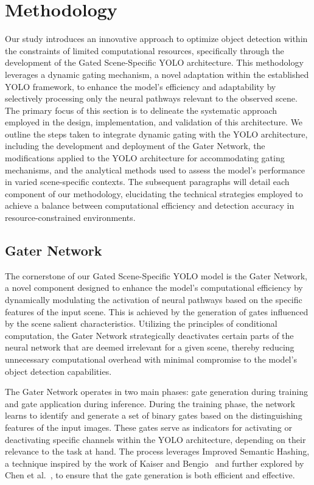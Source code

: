 \section{Methodology} 

Our study introduces an innovative approach to optimize object detection within the constraints of limited computational resources, specifically through the development of the Gated Scene-Specific YOLO architecture. This methodology leverages a dynamic gating mechanism, a novel adaptation within the established YOLO framework, to enhance the model's efficiency and adaptability by selectively processing only the neural pathways relevant to the observed scene. The primary focus of this section is to delineate the systematic approach employed in the design, implementation, and validation of this architecture. We outline the steps taken to integrate dynamic gating with the YOLO architecture, including the development and deployment of the Gater Network, the modifications applied to the YOLO architecture for accommodating gating mechanisms, and the analytical methods used to assess the model's performance in varied scene-specific contexts. The subsequent paragraphs will detail each component of our methodology, elucidating the technical strategies employed to achieve a balance between computational efficiency and detection accuracy in resource-constrained environments.

\subsection{Gater Network}
The cornerstone of our Gated Scene-Specific YOLO model is the Gater Network, a novel component designed to enhance the model's computational efficiency by dynamically modulating the activation of neural pathways based on the specific features of the input scene. This is achieved by the generation of gates influenced by the scene salient characteristics. Utilizing the principles of conditional computation, the Gater Network strategically deactivates certain parts of the neural network that are deemed irrelevant for a given scene, thereby reducing unnecessary computational overhead with minimal compromise to the model's object detection capabilities.

The Gater Network operates in two main phases: gate generation during training and gate application during inference. During the training phase, the network learns to identify and generate a set of binary gates based on the distinguishing features of the input images. These gates serve as indicators for activating or deactivating specific channels within the YOLO architecture, depending on their relevance to the task at hand. The process leverages Improved Semantic Hashing, a technique inspired by the work of Kaiser and Bengio~\cite{kaiser2018discrete} and further explored by Chen et al.~\cite{chen2019you}, to ensure that the gate generation is both efficient and effective.

